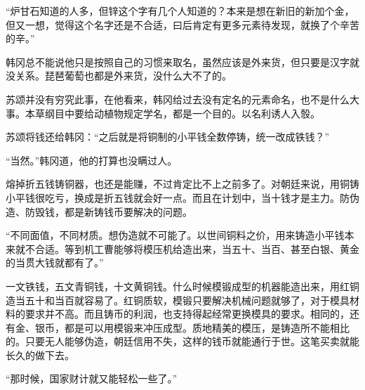 “炉甘石知道的人多，但锌这个字有几个人知道的？本来是想在新旧的新加个金，但又一想，觉得这个名字还是不合适，曰后肯定有更多元素待发现，就换了个辛苦的辛。”

韩冈总不能说他只是按照自己的习惯来取名，虽然应该是外来货，但只要是汉字就没关系。琵琶葡萄也都是外来货，没什么大不了的。

苏颂并没有穷究此事，在他看来，韩冈给过去没有定名的元素命名，也不是什么大事。本草纲目中要给动植物规定学名，都是一个目的。以名利诱人入彀。

苏颂将钱还给韩冈：“之后就是将铜制的小平钱全数停铸，统一改成铁钱？”

“当然。”韩冈道，他的打算也没瞒过人。

熔掉折五钱铸铜器，也还是能赚，不过肯定比不上之前多了。对朝廷来说，用铜铸小平钱很吃亏，换成是折五钱就会好一点。而且在计划中，当十钱才是主力。防伪造、防毁钱，都是新铸钱币要解决的问题。

“不同面值，不同材质。想伪造就不可能了。以世间铜料之价，用来铸造小平钱本来就不合适。等到机工曹能够将模压机给造出来，当五十、当百、甚至白银、黄金的当贯大钱就都有了。”

一文铁钱，五文青铜钱，十文黄铜钱。什么时候模锻成型的机器能造出来，用红铜造当五十和当百就容易了。红铜质软，模锻只要解决机械问题就够了，对于模具材料的要求并不高。而且铸币的利润，也支持得起经常更换模具的要求。相同的，还有金、银币，都是可以用模锻来冲压成型。质地精美的模压，是铸造所不能相比的。只要无人能够伪造，朝廷信用不失，这样的钱币就能通行于世。这笔买卖就能长久的做下去。

“那时候，国家财计就又能轻松一些了。”

